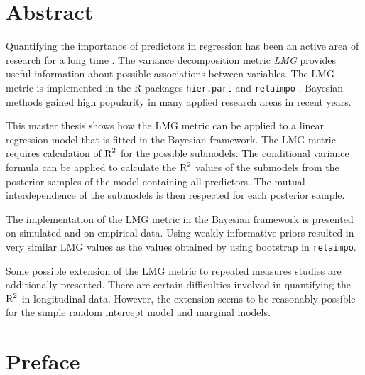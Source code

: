 \documentclass[11pt,a4paper,twoside]{book}\usepackage[]{graphicx}\usepackage[]{color}
\begin{document}


\graphicspath{{./figure/}}
\setcounter{tocdepth}{1}


\chapter*{Abstract}

Quantifying the importance of predictors in regression has been an active area of research for a long time \citep{Gromping2015}. The variance decomposition metric \textit{LMG} provides useful information about possible associations between variables. The LMG metric is implemented in the R packages \texttt{hier.part} \citep{Walsh2015} and \texttt{relaimpo} \citep{Gromping2006}. Bayesian methods gained high popularity in many applied research areas in recent years.  

This master thesis shows how the LMG metric can be applied to a linear regression model that is fitted in the Bayesian framework. The LMG metric requires calculation of $\text{R}^2$ for the possible submodels. The conditional variance formula can be applied to calculate the $\text{R}^2$ values of the submodels from the posterior samples of the model containing all predictors. The mutual interdependence of the submodels is then respected for each posterior sample.

The implementation of the LMG metric in the Bayesian framework is presented on simulated and on empirical data. Using weakly informative priors resulted in very similar LMG values as the values obtained by using bootstrap in \texttt{relaimpo}. 

Some possible extension of the LMG metric to repeated measures studies are additionally presented. There are certain difficulties involved in quantifying the $\text{R}^2$ in longitudinal data. However,  the extension seems to be reasonably possible for the simple random intercept model and marginal models.  


\tableofcontents
{}

\chapter*{Preface}
\thispagestyle{plain}
\end{document}
